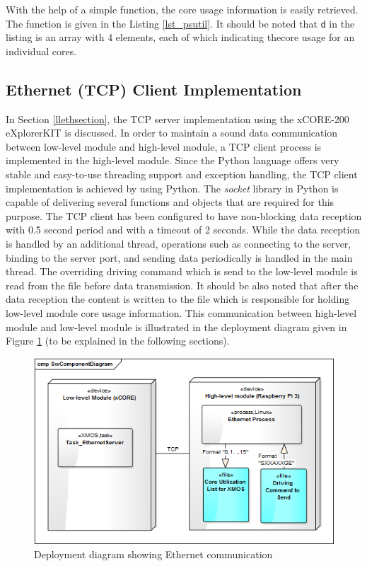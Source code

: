 With the help of a simple function, the core usage information is easily retrieved. The function is given in the Listing \ref{lst_psutil}. It should be noted that \texttt{d} in the listing is an array with 4 elements, each of which indicating thecore usage for an individual cores.



\subsection{Ethernet (TCP) Client Implementation}
In Section \ref{llethsection}, the TCP server implementation using the xCORE-200 eXplorerKIT is discussed. In order to maintain a sound data communication between low-level module and high-level module, a TCP client process is implemented in the high-level module. Since the Python language offers very stable and easy-to-use threading support and exception handling, the TCP client implementation is achieved by using Python. The \textit{socket} library \cite{socketpython} in Python is capable of delivering several functions and objects that are required for this purpose. The TCP client has been configured to have non-blocking data reception with 0.5 second period and with a timeout of 2 seconds. While the data reception is handled by an additional thread, operations such as connecting to the server, binding to the server port, and sending data periodically is handled in the main thread. The overriding driving command which is send to the low-level module is read from the file before data transmission. It should be also noted that after the data reception the content is written to the file which is responsible for holding low-level module core usage information. This communication between high-level module and low-level module is illustrated in the deployment diagram given in Figure \ref{fig:ethernetdeployment} (to be explained in the following sections).

\begin{figure}[!ht]
	\centering
	\captionsetup{justification=centering}
	\includegraphics[scale=0.7]{content/images/ethernetdeployment.png}
	\caption{Deployment diagram showing Ethernet communication}
	\label{fig:ethernetdeployment}
\end{figure}

